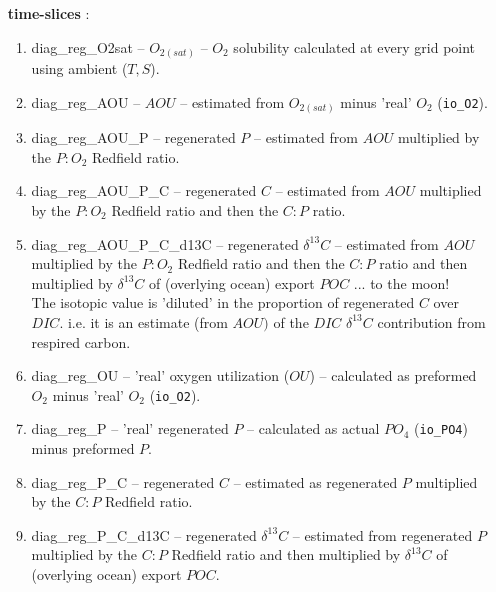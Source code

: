 \begin{itemize}[noitemsep]
\vspace{1mm}
\item [\textbf{time-slices}]:
\begin{enumerate}[noitemsep]
\vspace{1mm}
\item \textsf{\footnotesize diag\_reg\_O2sat} -- \(O_{2(sat)}\) -- \(O_{2}\) solubility calculated at every grid point using ambient (\(T,S\)).
\vspace{1mm}
\item \textsf{\footnotesize diag\_reg\_AOU} -- \(AOU\) -- estimated from  \(O_{2(sat)}\) minus  'real' \(O_{2}\) (\texttt{io\_O2}).
\vspace{1mm}
\item \textsf{\footnotesize diag\_reg\_AOU\_P} -- regenerated \(P\) -- estimated from \(AOU\) multiplied by the \(P:O_{2}\) Redfield ratio.
\vspace{1mm}
\item \textsf{\footnotesize diag\_reg\_AOU\_P\_C} -- regenerated \(C\) -- estimated from \(AOU\) multiplied by the \(P:O_{2}\) Redfield ratio and then the \(C:P\) ratio.
\vspace{1mm}
\item \textsf{\footnotesize diag\_reg\_AOU\_P\_C\_d13C} -- regenerated \(\delta^{13}C\) -- estimated from \(AOU\) multiplied by the \(P:O_{2}\) Redfield ratio and then the \(C:P\) ratio and then multiplied by \(\delta^{13}C\) of (overlying ocean) export \(POC\) ... to the moon!
\\The isotopic value is 'diluted' in the proportion of regenerated \(C\) over \(DIC\). i.e. it is an estimate (from \(AOU)\) of the \(DIC\) \(\delta^{13}C\) contribution from respired carbon.
\vspace{1mm}
\item \textsf{\footnotesize diag\_reg\_OU} -- 'real' oxygen utilization (\(OU\)) -- calculated as preformed \(O_{2}\) minus 'real' \(O_{2}\) (\texttt{io\_O2}).
\vspace{1mm}
\item \textsf{\footnotesize diag\_reg\_P} -- 'real' regenerated \(P\) -- calculated as actual \(PO_{4}\) (\texttt{io\_PO4}) minus preformed \(P\).
\vspace{1mm}
\item \textsf{\footnotesize diag\_reg\_P\_C} -- regenerated \(C\) -- estimated as regenerated \(P\) multiplied by the \(C:P\) Redfield ratio.
\vspace{1mm}
\item \textsf{\footnotesize diag\_reg\_P\_C\_d13C} -- regenerated \(\delta^{13}C\) -- estimated from regenerated \(P\) multiplied by the \(C:P\) Redfield ratio and then multiplied by \(\delta^{13}C\) of (overlying ocean) export \(POC\). 

\end{enumerate}
\end{itemize}
